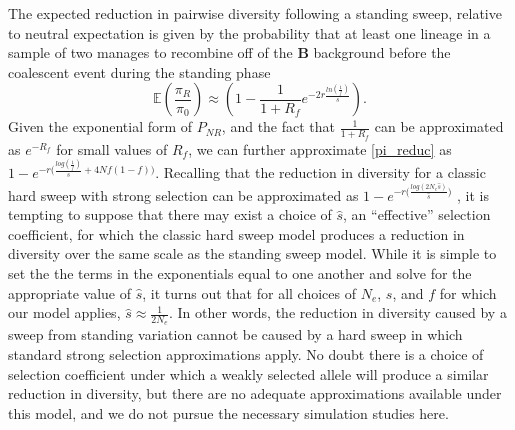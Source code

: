 \documentclass[a4paper,10pt]{article}
\begin{document}
The expected reduction in pairwise diversity following a standing sweep, relative to neutral expectation is given by the probability that at least one lineage in a sample of two manages to recombine off of the \textbf{B} background before the coalescent event during the standing phase
\begin{equation}
	\mathbb{E}\left(\frac{\pi_R}{\pi_0}\right) \approx \left(1-\frac{1}{1 + R_f} e^{-2r\frac{ln\left(\frac{1}{f}\right)}{s}}  \right). \label{pi_reduc}
\end{equation}
Given the exponential form of $P_{NR}$, and the fact that $\frac{1}{1+R_f}$ can be approximated as $e^{-R_f}$ for small values of $R_f$, we can further approximate \eqref{pi_reduc} as $1- e^{-r\bigl(\frac{log\left(\frac{1}{f}\right)}{s} + 4Nf(1-f)\bigr)}$. Recalling that the reduction in diversity for a classic hard sweep with strong selection can be approximated as $1- e^{-r\bigl(\frac{log\left(2N_e \hat{s}\right)}{\hat{s}}\bigr)}$ \citep{Durrett:2004fl,Pennings2006}, it is tempting to suppose that there may exist a choice of $\hat{s}$, an ``effective'' selection coefficient, for which the classic hard sweep model produces a reduction in diversity over the same scale as the standing sweep model. While it is simple to set the the terms in the exponentials equal to one another and solve for the appropriate value of $\hat{s}$, it turns out that for all choices of $N_e$, $s$, and $f$ for which our model applies, $\hat{s} \approx \frac{1}{2N_e}$. In other words, the reduction in diversity caused by a sweep from standing variation cannot be caused by a hard sweep in which standard strong selection approximations apply. No doubt there is a choice of selection coefficient under which a weakly selected allele will produce a similar reduction in diversity, but there are no adequate approximations available under this model, and we do not pursue the necessary simulation studies here.
\end{document}
